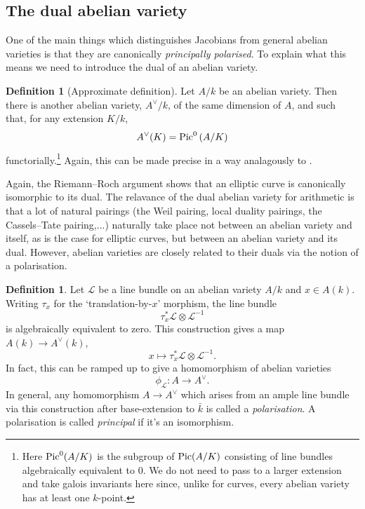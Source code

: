 \documentclass[12pt]{amsart}
\numberwithin{equation}{section}
\theoremstyle{remark}
\theoremstyle{definition}
\theoremstyle{definition}
\theoremstyle{definition}
\newtheorem{defi}[equation]{Definition}
\theoremstyle{definition}
\theoremstyle{definition}
\theoremstyle{definition}
\begin{document}
\subsection{The dual abelian variety}

One of the main things which distinguishes Jacobians from general abelian varieties is that they are canonically \textit{principally polarised}. To explain what this means we need to introduce the dual of an abelian variety. 

\begin{defi}[Approximate definition]
Let $A/k$ be an abelian variety. Then there is another abelian variety, $A^\vee/k$, of the same dimension of $A$, and such that, for any extension $K/k$, \[A^\vee(K)=\textup{Pic}^0\left(A/K\right)\]
functorially.\footnote{Here $\textup{Pic}^0(A/K)$ is the subgroup of $\textup{Pic}(A/K)$ consisting of line bundles algebraically equivalent to $0$. We do not need to  pass to a larger extension and  take galois invariants here since, unlike for curves, every abelian variety has at least one $k$-point.}  Again, this can be made precise in a way analagously to .
\end{defi}

Again, the Riemann--Roch argument shows that an elliptic curve is canonically isomorphic to its dual. The relavance of the dual abelian variety for arithmetic is that a lot of natural pairings (the Weil pairing, local duality pairings, the Cassels--Tate pairing,...) naturally take place not between an abelian variety and itself, as is the case for elliptic curves, but between an abelian variety and its dual. However, abelian varieties are closely related to their duals via the notion of a polarisation. 

\begin{defi}
Let $\mathcal{L}$ be a line bundle on an abelian variety $A/k$ and $x\in A(k)$. Writing $\tau_x$ for the `translation-by-$x$' morphism, the line bundle 
\[\tau^*_x\mathcal{L}\otimes \mathcal{L}^{-1}\]
is algebraically equivalent to zero. This construction gives a map $A(k)\rightarrow A^\vee(k)$, 
\[x \longmapsto \tau^*_x\mathcal{L}\otimes \mathcal{L}^{-1}.\]
 In fact, this can be ramped up to give a homomorphism of abelian varieties 
\[\phi_\mathcal{L}:A\longrightarrow A^\vee.\]
In general, any homomorphism $A\rightarrow A^\vee$ which arises from an ample line bundle via this construction after base-extension to $\bar{k}$ is called a \textit{polarisation}.
A polarisation is called \textit{principal} if it's an isomorphism.
\end{defi}  
\end{document}
